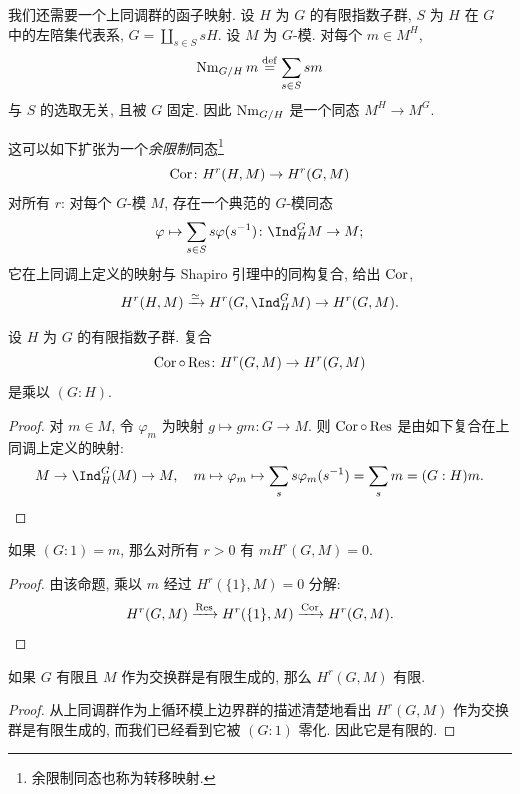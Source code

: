 \begin{example}\label{ex:ii.1.29}
我们还需要一个上同调群的函子映射. 设 $H$ 为 $G$ 的有限指数子群, $S$ 为 $H$ 在 $G$ 中的左陪集代表系, $G=\coprod_{s\in S}sH$. 设 $M$ 为 $G$-模. 对每个 $m\in M^H$,
\[
 \operatorname{Nm}_{G/H}m\stackrel{\mathrm{def}}{=}\sum_{s\in S}sm
\]
与 $S$ 的选取无关, 且被 $G$ 固定. 因此 $\operatorname{Nm}_{G/H}$ 是一个同态 $M^H\to M^G$.

这可以如下扩张为一个\emph{余限制}同态\footnote{余限制同态也称为转移映射.}
\[
 \operatorname{Cor}\colon H^r(H,M)\to H^r(G,M)
\]
对所有 $r$: 对每个 $G$-模 $M$, 存在一个典范的 $G$-模同态
\[
 \varphi\mapsto \sum_{s\in S}s\varphi(s^{-1})\colon \Ind_H^G M\to M;
\]
它在上同调上定义的映射与 Shapiro 引理中的同构复合, 给出 $\operatorname{Cor}$,
\[
 H^r(H,M)\xrightarrow{\simeq} H^r(G,\Ind_H^G M)\to H^r(G,M).
\]
\end{example}

\begin{proposition}\label{prop:ii.1.30}
设 $H$ 为 $G$ 的有限指数子群. 复合
\[
 \operatorname{Cor}\circ \operatorname{Res}\colon H^r(G,M)\to H^r(G,M)
\]
是乘以 $(G:H)$.
\end{proposition}

\begin{proof}
对 $m\in M$, 令 $\varphi_m$ 为映射 $g\mapsto gm\colon G\to M$. 则 $\operatorname{Cor}\circ\operatorname{Res}$ 是由如下复合在上同调上定义的映射:
\[
 M\to \Ind_H^G(M)\to M,\quad m\mapsto \varphi_m\mapsto \sum_s s\varphi_m(s^{-1})=\sum_s m=(G:H)m.
\]
\end{proof}

\begin{corollary}\label{cor:ii.1.31}
如果 $(G:1)=m$, 那么对所有 $r>0$ 有 $mH^r(G,M)=0$.
\end{corollary}

\begin{proof}
由该命题, 乘以 $m$ 经过 $H^r(\{1\},M)=0$ 分解:
\[
 H^r(G,M)\xrightarrow{\operatorname{Res}} H^r(\{1\},M)\xrightarrow{\operatorname{Cor}} H^r(G,M).
\]
\end{proof}

\begin{corollary}\label{cor:ii.1.32}
如果 $G$ 有限且 $M$ 作为交换群是有限生成的, 那么 $H^r(G,M)$ 有限.
\end{corollary}

\begin{proof}
从上同调群作为上循环模上边界群的描述清楚地看出 $H^r(G,M)$ 作为交换群是有限生成的, 而我们已经看到它被 $(G:1)$ 零化. 因此它是有限的.
\end{proof}

